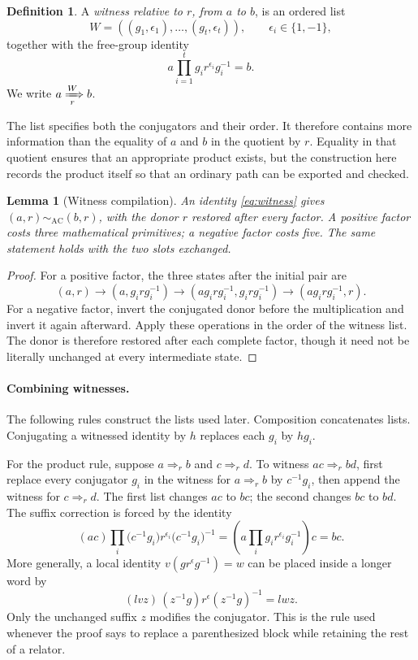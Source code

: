 \documentclass[11pt]{article}
\newtheorem{lemma}[theorem]{Lemma}
\theoremstyle{definition}\newtheorem{definition}[theorem]{Definition}
\theoremstyle{remark}\newtheorem{remark}[theorem]{Remark}
\newcommand{\AC}{\mathrel{\sim_{\mathrm{AC}}}}
\newcommand{\wit}[1]{\mathrel{\Longrightarrow_{#1}}}
\begin{document}
\begin{definition}\label{def:witness}
A \emph{witness relative to $r$, from $a$ to $b$}, is an ordered list
\[
W=((g_1,\epsilon_1),\ldots,(g_t,\epsilon_t)),\qquad \epsilon_i\in\{1,-1\},
\]
together with the free-group identity
\begin{equation}\label{eq:witness}
a\prod_{i=1}^t g_i r^{\epsilon_i}g_i^{-1}=b.
\end{equation}
We write $a\xRightarrow[\,r\,]{W}b$.
\end{definition}
The list specifies both the conjugators and their order. It therefore contains more information than the equality of $a$ and $b$ in the quotient by $r$. Equality in that quotient ensures that an appropriate product exists, but the construction here records the product itself so that an ordinary path can be exported and checked.

\begin{lemma}[Witness compilation]\label{lem:compile}
An identity \eqref{eq:witness} gives $(a,r)\AC(b,r)$, with the donor $r$ restored after every factor. A positive factor costs three mathematical primitives; a negative factor costs five. The same statement holds with the two slots exchanged.
\end{lemma}
\begin{proof}
For a positive factor, the three states after the initial pair are
\[
(a,r)\longrightarrow(a,g_i r g_i^{-1})
\longrightarrow(ag_i r g_i^{-1},g_i r g_i^{-1})
\longrightarrow(ag_i r g_i^{-1},r).
\]
For a negative factor, invert the conjugated donor before the multiplication and invert it again afterward. Apply these operations in the order of the witness list. The donor is therefore restored after each complete factor, though it need not be literally unchanged at every intermediate state.
\end{proof}

\paragraph{Combining witnesses.}
The following rules construct the lists used later. Composition concatenates lists. Conjugating a witnessed identity by $h$ replaces each $g_i$ by $hg_i$.

For the product rule, suppose $a\wit r b$ and $c\wit r d$. To witness $ac\wit r bd$, first replace every conjugator $g_i$ in the witness for $a\wit r b$ by $c^{-1}g_i$, then append the witness for $c\wit r d$. The first list changes $ac$ to $bc$; the second changes $bc$ to $bd$. The suffix correction is forced by the identity
\[
(ac)\prod_i\bigl(c^{-1}g_i\bigr)r^{\epsilon_i}
\bigl(c^{-1}g_i\bigr)^{-1}
=\left(a\prod_i g_i r^{\epsilon_i}g_i^{-1}\right)c=bc.
\]
More generally, a local identity $v(g r^{\epsilon}g^{-1})=w$ can be placed inside a longer word by
\[
(lvz)\,(z^{-1}g)r^{\epsilon}(z^{-1}g)^{-1}=lwz.
\]
Only the unchanged suffix $z$ modifies the conjugator. This is the rule used whenever the proof says to replace a parenthesized block while retaining the rest of a relator.
\end{document}
